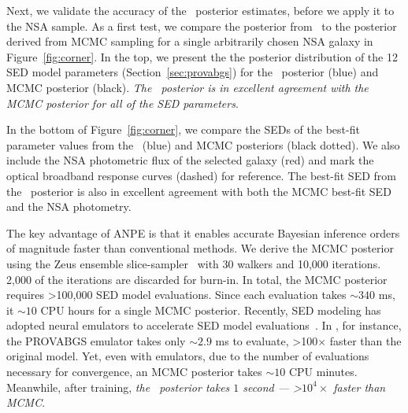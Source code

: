 Next, we validate the accuracy of the \sedflow~posterior estimates, before we
apply it to the NSA sample.
As a first test, we compare the posterior from \sedflow~to the posterior derived
from MCMC sampling for a single arbitrarily chosen NSA galaxy in
Figure~\ref{fig:corner}. 
In the top, we present the the posterior distribution of the 12 SED model
parameters (Section~\ref{sec:provabgs}) for the \sedflow~posterior (blue) and
MCMC posterior (black). 
\emph{The \sedflow~posterior is in excellent agreement with the MCMC posterior
for all of the SED parameters}. 
 
In the bottom of Figure~\ref{fig:corner}, we compare the SEDs of the best-fit
parameter values from the \sedflow~(blue) and MCMC posteriors (black dotted). 
We also include the NSA photometric flux of the selected galaxy (red) and mark
the optical broadband response curves (dashed) for reference. 
The best-fit SED from the \sedflow~posterior is also in excellent agreement
with both the MCMC best-fit SED and the NSA photometry.  

The key advantage of ANPE is that it enables accurate Bayesian inference
orders of magnitude faster than conventional methods. 
We derive the MCMC posterior using the {\sc Zeus} ensemble
slice-sampler~\citep{karamanis2020} with 30 walkers and 10,000 iterations.
2,000 of the iterations are discarded for burn-in. 
In total, the MCMC posterior requires >100,000 SED model evaluations. 
Since each evaluation takes ${\sim}340$ ms, it ${\sim}10$ CPU hours for
a single MCMC posterior. 
Recently, SED modeling has adopted neural emulators to accelerate SED model
evaluations~\citep{alsing2020}. 
In , for instance, the PROVABGS emulator takes
only ${\sim}2.9$ ms to evaluate, >100$\times$ faster than the original model. 
Yet, even with emulators, due to the number of evaluations necessary for
convergence, an MCMC posterior takes ${\sim}10$ CPU minutes. 
Meanwhile, after training, \emph{the \sedflow~posterior takes $1$ second ---
>$10^4\times$ faster than MCMC}. 

